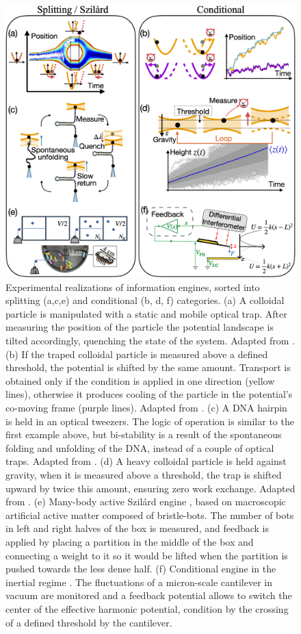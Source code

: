 \documentclass[aps, twocolumn,floatfix,showpacs, superscriptaddress]{revtex4-2}
\begin{document}
\begin{figure} [h!]
    \centering
    \includegraphics[scale = 0.235]{Experiments.png}
    \caption{Experimental realizations of information engines, sorted into splitting (a,c,e) and conditional (b, d, f) categories.
    (a) A colloidal particle is manipulated with a static and  mobile optical trap. After measuring the position of the particle the potential landscape is tilted accordingly, quenching the state of the system. Adapted from \cite{roldan_universal_2014}.
    (b) If the traped colloidal particle is measured above a defined threshold, the potential is shifted by the same amount. Transport is obtained only if the condition is applied in one direction (yellow lines), otherwise it produces cooling of the particle in the potential's co-moving frame (purple lines). Adapted from \cite{lee_experimentally-achieved_2018}.
    (c) A DNA hairpin is held in an optical tweezers. The logic of operation is similar to the first example above, but bi-stability is a result of the spontaneous folding and unfolding of the DNA, instead of a couple of optical traps. Adapted from \cite{Ribezzi_Crivellari_2019}.
    (d) A heavy colloidal particle is held against gravity, when it is measured above a threshold, the trap is shifted upward by twice this amount, ensuring zero work exchange.  Adapted from \cite{saha2021maximizing}.
    (e) Many-body active Szil\'ard engine \cite{Chor2023}, based on macroscopic artificial active matter composed of bristle-bots. The number of bots in left and right halves of the box is measured, and feedback is applied by placing a partition in the middle of the box and connecting a weight to it so it would be lifted when the partition is pushed towards the less dense half.
    (f) Conditional engine in the inertial regime \cite{archambault2024first}. The fluctuations of a micron-scale cantilever in vacuum are monitored and a feedback potential allows to switch the center of the effective harmonic potential, condition by the crossing of a defined threshold by the cantilever.}
    \label{fig:Experiments}
\end{figure}
\end{document}
